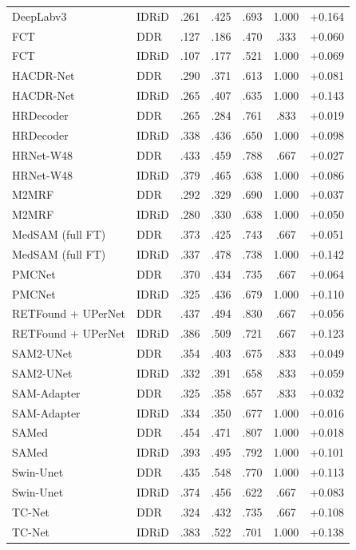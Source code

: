 {\begin{longtable}{l l c c c c c}
DeepLabv3 & IDRiD & .261 & .425 & .693 & 1.000 & +0.164 \\
FCT & DDR & .127 & .186 & .470 & .333 & +0.060 \\
FCT & IDRiD & .107 & .177 & .521 & 1.000 & +0.069 \\
HACDR-Net & DDR & .290 & .371 & .613 & 1.000 & +0.081 \\
HACDR-Net & IDRiD & .265 & .407 & .635 & 1.000 & +0.143 \\
HRDecoder & DDR & .265 & .284 & .761 & .833 & +0.019 \\
HRDecoder & IDRiD & .338 & .436 & .650 & 1.000 & +0.098 \\
HRNet-W48 & DDR & .433 & .459 & .788 & .667 & +0.027 \\
HRNet-W48 & IDRiD & .379 & .465 & .638 & 1.000 & +0.086 \\
M2MRF & DDR & .292 & .329 & .690 & 1.000 & +0.037 \\
M2MRF & IDRiD & .280 & .330 & .638 & 1.000 & +0.050 \\
MedSAM (full FT) & DDR & .373 & .425 & .743 & .667 & +0.051 \\
MedSAM (full FT) & IDRiD & .337 & .478 & .738 & 1.000 & +0.142 \\
PMCNet & DDR & .370 & .434 & .735 & .667 & +0.064 \\
PMCNet & IDRiD & .325 & .436 & .679 & 1.000 & +0.110 \\
RETFound + UPerNet & DDR & .437 & .494 & .830 & .667 & +0.056 \\
RETFound + UPerNet & IDRiD & .386 & .509 & .721 & .667 & +0.123 \\
SAM2-UNet & DDR & .354 & .403 & .675 & .833 & +0.049 \\
SAM2-UNet & IDRiD & .332 & .391 & .658 & .833 & +0.059 \\
SAM-Adapter & DDR & .325 & .358 & .657 & .833 & +0.032 \\
SAM-Adapter & IDRiD & .334 & .350 & .677 & 1.000 & +0.016 \\
SAMed & DDR & .454 & .471 & .807 & 1.000 & +0.018 \\
SAMed & IDRiD & .393 & .495 & .792 & 1.000 & +0.101 \\
Swin-Unet & DDR & .435 & .548 & .770 & 1.000 & +0.113 \\
Swin-Unet & IDRiD & .374 & .456 & .622 & .667 & +0.083 \\
TC-Net & DDR & .324 & .432 & .735 & .667 & +0.108 \\
TC-Net & IDRiD & .383 & .522 & .701 & 1.000 & +0.138 \\

\end{longtable}}
